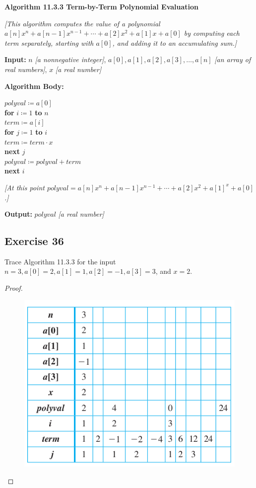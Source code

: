 \documentclass[14pt]{extarticle}
\newcommand{\cy}{\color{cyan}}
\begin{document}
\begin{tcolorbox}[colframe=cyan]
{\bf \cy Algorithm 11.3.3 Term-by-Term Polynomial Evaluation}

{\it [This algorithm computes the value of a polynomial \(a[n]x^n + a[n-1]x^{n-1} + \cdots + a[2]x^2 + a[1]x + a[0]\) 
by computing each term separately, starting with \(a[0]\), and adding it to an accumulating sum.]}

{\bf Input:} \(n\) {\it [a nonnegative integer]}, \(a[0], a[1], a[2], a[3], \ldots, a[n]\) {\it [an array of real 
numbers]}, \(x\) {\it [a real number]}

{\bf Algorithm Body:} 
\begin{tabbing}
\(polyval \coloneqq a[0]\) \\
{\bf for} \= \(i \coloneqq 1\) {\bf to} \(n\) \\
          \> \(term \coloneqq a[i]\) \\
          \> {\bf for} \= \(j \coloneqq 1\) {\bf to} \(i\)\\
          \>           \> \(term \coloneqq term \cdot x\)\\
          \> {\bf next} \(j\) \\
          \> \(polyval \coloneqq polyval + term\) \\
{\bf next} \(i\)
\end{tabbing}

{\it [At this point \(polyval = a[n]x^n + a[n-1]x^{n-1} + \cdots + a[2]x^2 + a[1]^x + a[0]\).]}

{\bf Output:} \(polyval\) {\it [a real number]}
\end{tcolorbox}

\subsection{Exercise 36}
Trace Algorithm 11.3.3 for the input \(n = 3, a[0] = 2, a[1] = 1, a[2] = -1, a[3] = 3\), and \(x = 2\).

\begin{proof}
\begin{figure}[ht!]
\centering
\includegraphics[scale=0.6]{../images/11.3.36.png}
\end{figure}
\end{proof}
\end{document}

